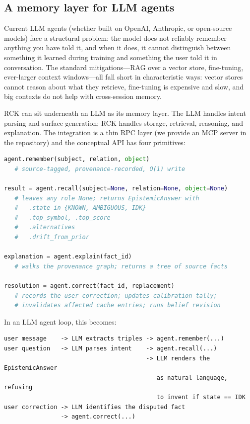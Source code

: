 \documentclass[11pt]{article}
\begin{document}
\subsection{A memory layer for LLM agents}

Current LLM agents (whether built on OpenAI, Anthropic, or
open-source models) face a structural problem: the model does not
reliably remember anything you have told it, and when it does, it
cannot distinguish between something it learned during training and
something the user told it in conversation. The standard
mitigations---RAG over a vector store, fine-tuning, ever-larger
context windows---all fall short in characteristic ways: vector
stores cannot reason about what they retrieve, fine-tuning is
expensive and slow, and big contexts do not help with cross-session
memory.

RCK can sit underneath an LLM as its memory layer. The LLM handles
intent parsing and surface generation; RCK handles storage,
retrieval, reasoning, and explanation. The integration is a thin
RPC layer (we provide an MCP server in the repository) and the
conceptual API has four primitives:

\begin{lstlisting}[language=Python]
agent.remember(subject, relation, object)
   # source-tagged, provenance-recorded, O(1) write

result = agent.recall(subject=None, relation=None, object=None)
   # leaves any role None; returns EpistemicAnswer with
   #   .state in {KNOWN, AMBIGUOUS, IDK}
   #   .top_symbol, .top_score
   #   .alternatives
   #   .drift_from_prior

explanation = agent.explain(fact_id)
   # walks the provenance graph; returns a tree of source facts

resolution = agent.correct(fact_id, replacement)
   # records the user correction; updates calibration tally;
   # invalidates affected cache entries; runs belief revision
\end{lstlisting}

In an LLM agent loop, this becomes:

\begin{lstlisting}
user message    -> LLM extracts triples -> agent.remember(...)
user question   -> LLM parses intent    -> agent.recall(...)
                                        -> LLM renders the EpistemicAnswer
                                           as natural language, refusing
                                           to invent if state == IDK
user correction -> LLM identifies the disputed fact
                -> agent.correct(...)
\end{lstlisting}
\end{document}

